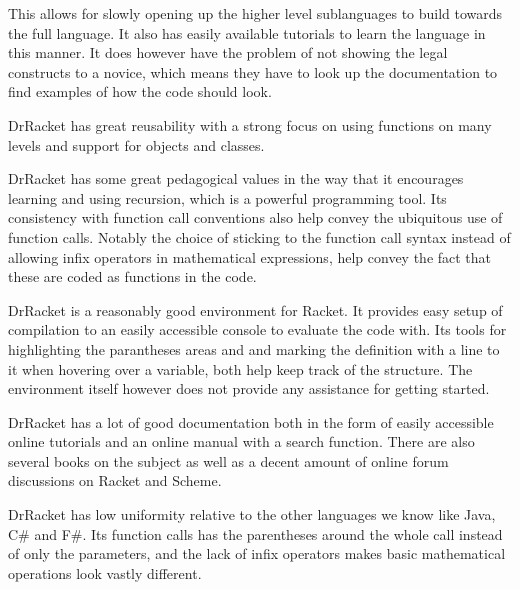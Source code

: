 \begin{description}[style=nextline]
This allows for slowly opening up the higher level sublanguages to build towards the full language.
It also has easily available tutorials to learn the language in this manner.
It does however have the problem of not showing the legal constructs to a novice, which means they have to look up the documentation to find examples of how the code should look.
\item[Reusability] DrRacket has great reusability with a strong focus on using functions on many levels and support for objects and classes.
\item[Pedagogic Value] DrRacket has some great pedagogical values in the way that it encourages learning and using recursion, which is a powerful programming tool.
Its consistency with function call conventions also help convey the ubiquitous use of function calls.
Notably the choice of sticking to the function call syntax instead of allowing infix operators in mathematical expressions, help convey the fact that these are coded as functions in the code.
\item[Environment] DrRacket is a reasonably good environment for Racket.
It provides easy setup of compilation to an easily accessible console to evaluate the code with.
Its tools for highlighting the parantheses areas and and marking the definition with a line to it when hovering over a variable, both help keep track of the structure.
The environment itself however does not provide any assistance for getting started.
\item[Documentation] DrRacket has a lot of good documentation both in the form of easily accessible online tutorials and an online manual with a search function.
There are also several books on the subject as well as a decent amount of online forum discussions on Racket and Scheme.
\item[Uniformity] DrRacket has low uniformity relative to the other languages we know like Java, C\# and F\#.
Its function calls has the parentheses around the whole call instead of only the parameters, and the lack of infix operators makes basic mathematical operations look vastly different.
\end{description}